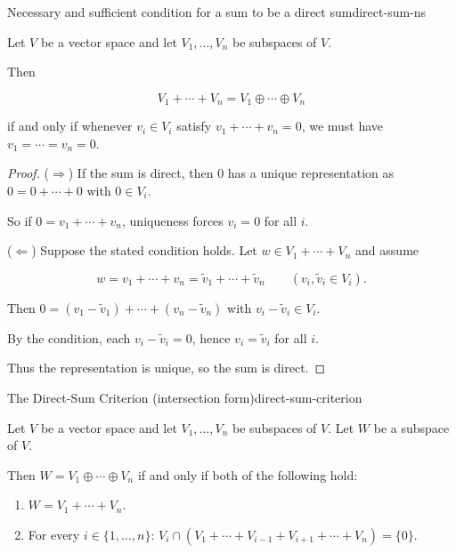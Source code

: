 \begin{theorem}{Necessary and sufficient condition for a sum to be a direct sum}{direct-sum-ns}

Let $V$ be a vector space and let $V_1,\dots,V_n$ be subspaces of $V$.

Then

\[
V_1+\cdots+V_n = V_1\oplus\cdots\oplus V_n
\]

if and only if whenever $v_i\in V_i$ satisfy $v_1+\cdots+v_n=0$, we must have $v_1=\cdots=v_n=0$.

\end{theorem}

\begin{proof}

($\Rightarrow$) If the sum is direct, then $0$ has a unique representation as $0=0+\cdots+0$ with $0\in V_i$.

So if $0=v_1+\cdots+v_n$, uniqueness forces $v_i=0$ for all $i$.

($\Leftarrow$) Suppose the stated condition holds. Let $w\in V_1+\cdots+V_n$ and assume

\[
w=v_1+\cdots+v_n=\tilde v_1+\cdots+\tilde v_n
\qquad (v_i,\tilde v_i\in V_i).
\]

Then $0=(v_1-\tilde v_1)+\cdots+(v_n-\tilde v_n)$ with $v_i-\tilde v_i\in V_i$.

By the condition, each $v_i-\tilde v_i=0$, hence $v_i=\tilde v_i$ for all $i$.

Thus the representation is unique, so the sum is direct.

\end{proof}

\begin{theorem}{The Direct-Sum Criterion (intersection form)}{direct-sum-criterion}

Let $V$ be a vector space and let $V_1,\dots,V_n$ be subspaces of $V$.
Let $W$ be a subspace of $V$.

Then $W=V_1\oplus\cdots\oplus V_n$ if and only if both of the following hold:
\begin{enumerate}[label=(\arabic*), leftmargin=*]
\item $W=V_1+\cdots+V_n$.
\item For every $i\in\{1,\dots,n\}$: $V_i\cap(V_1+\cdots+V_{i-1}+V_{i+1}+\cdots+V_n)=\{0\}$.
\end{enumerate}

\end{theorem}

